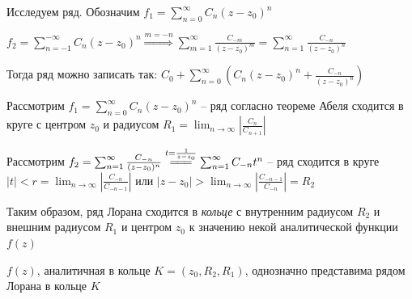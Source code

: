 \documentclass[12pt]{article}
\begin{document}
\Nota Исследуем ряд. Обозначим $f_1 = \sum_{n = 0}^\infty C_n (z - z_0)^n$

$f_2 = \sum_{n = -1}^{-\infty} C_n (z - z_0)^n \overset{m = -n}{\Longrightarrow} \sum_{m = 1}^\infty \frac{C_{-m}}{(z - z_0)^m} = \sum_{n = 1}^\infty \frac{C_{-n}}{(z - z_0)^n}$

Тогда ряд можно записать так: $C_0 + \sum_{n = 0}^\infty \left(C_n (z - z_0)^n + \frac{C_{-n}}{(z - z_0)^n}\right)$

Рассмотрим $f_1 = \sum_{n = 0}^\infty C_n (z - z_0)^n$ -- ряд согласно теореме Абеля сходится в круге с центром $z_0$ и радиусом $R_1 = \lim_{n \to \infty} \left|\frac{C_{n}}{C_{n+1}}\right|$

Рассмотрим $f_2 = \sum_{n = 1}^\infty \frac{C_{-n}}{(z - z_0)^n} \overset{t = \frac{1}{z - z_0}}{=\joinrel=\joinrel=} \sum_{n = 1}^\infty C_{-n} t^n$ -- ряд сходится в круге $|t| < r = \lim_{n \to \infty} \left|\frac{C_{-n}}{C_{-n-1}}\right|$ или $|z - z_0| > \lim_{n \to \infty} \left|\frac{C_{-n-1}}{C_{-n}}\right| = R_2$

Таким образом, ряд Лорана сходится в \textit{кольце} с внутренним радиусом $R_2$ и внешним радиусом $R_1$ и центром $z_0$ к значению некой аналитической функции $f(z)$


\begin{MyTheorem}
    $f(z)$, аналитичная в кольце $K = (z_0, R_2, R_1)$, однозначно представима рядом Лорана в кольце $K$
\end{MyTheorem}
\end{document}

